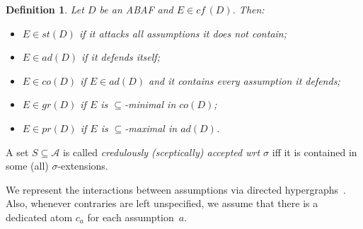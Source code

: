 \documentclass[letterpaper]{article} %
\newcommand{\cf}{\textit{cf}\,}
\newcommand{\adm}{\textit{ad}}
\newcommand{\com}{\textit{co}}
\newcommand{\comp}{\textit{co}}
\newcommand{\stb}{\textit{st}}
\newcommand{\prf}{\textit{pr}}
\newcommand{\grd}{\textit{gr}}
\newcommand{\asm}{\ensuremath{\mathcal{A}}}
\newtheorem{definition}[example]{Definition}
\begin{document}
\begin{definition}\label{def:ABA semantics}
	Let $D$ be an ABAF and $E\in\cf(D)$. Then:
	\begin{itemize}
        \item $E\in \stb(D)$ if it attacks all assumptions it does not contain;
		\item 
		$E\in \adm(D)$ if it defends itself; 
		\item 
		$E\in \com(D)$ if $E\in\adm(D)$ and it contains every assumption it defends; 
		\item  $E\in\grd(D)$ if $E$ is $\subseteq$-minimal in $\comp(D)$;
		\item 
		$E\in \prf(D)$ if $E$ is $\subseteq$-maximal in $\adm(D)$.
	\end{itemize}
\end{definition}
A set $S\subseteq \asm$ is called \emph{credulously (sceptically) accepted wrt $\sigma$} iff it is contained in some (all) $\sigma$-extensions. 



We represent the interactions between assumptions via directed hypergraphs~\cite{KoenigRU22}. 
Also, whenever contraries are left unspecified, we assume that there is a dedicated atom $c_a$ for each assumption~$a$.
\newcommand{\rcolfour}[1]{{\color{teal}#1}}
\newcommand{\rcoltwo}[1]{{\color{magenta}#1}}
\newcommand{\rcolthree}[1]{{\color{blue}#1}}
\newcommand{\rcolone}[1]{{\color{violet}#1}}
\end{document}

